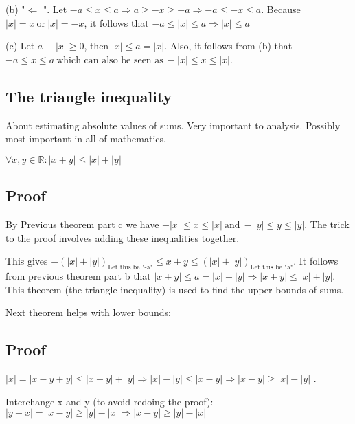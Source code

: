 \documentclass[class=scrartcl, crop=false]{standalone}
\begin{document}
(b) "$\Leftarrow$ ". Let $-a \leq x \leq a \Rightarrow a \geq -x \geq -a \Rightarrow -a \leq -x \leq a$. Because  $|x| = x \ \text{or} \ |x| = -x$, it follows that $-a \leq |x| \leq a \Rightarrow |x| \leq a$ 

(c) Let $a \equiv |x| \geq 0$, then $|x| \leq a = |x|$. Also, it follows from (b) that $-a \leq x \leq a \ \text{which can also be seen as} \ -|x| \leq x \leq |x|$.

\subsection{The triangle inequality}

About estimating absolute values of sums. Very important to analysis. Possibly most important in all of mathematics.

$\forall x, y \in \mathbb{R}: |x + y| \leq |x| + |y|$ 

\subsection{Proof}

By Previous theorem part c we have $-|x| \leq x \leq |x| \ \text{and} \ -|y| \leq y \leq |y|$. The trick to the proof involves adding these inequalities together.

This gives $-(|x| + |y|)_{\text{Let this be "-a"}} \leq x + y \leq (|x| + |y|)_{\text{Let this be "a"}}$. It follows from previous theorem part b that  $|x + y| \leq a = |x| + |y| \Rightarrow |x + y| \leq |x| + |y|$. This theorem (the triangle inequality) is used to find the upper bounds of sums.

Next theorem helps with lower bounds:


\subsection{Proof}

$|x| = |x - y + y| \leq |x - y| + |y| \Rightarrow |x| - |y| \leq |x - y| \Rightarrow |x - y| \geq |x| - |y|$ .

Interchange x and y (to avoid redoing the proof):
$|y - x| = |x - y| \geq |y| - |x| \Rightarrow |x - y| \geq |y| - |x|$
\end{document}
